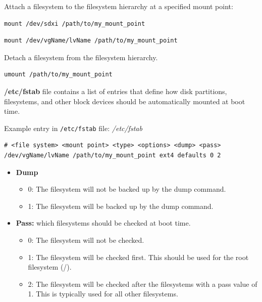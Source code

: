 \documentclass{article}
\newenvironment{codetemplate}[1][]{%
  \mybasecolorbox[#1]
  \itshape
}{%
  \endmybasecolorbox
}
\begin{document}
Attach a filesystem to the filesystem hierarchy at a specified mount point:
\begin{codetemplate}
\begin{verbatim}
mount /dev/sdxi /path/to/my_mount_point
\end{verbatim}
\end{codetemplate}

\begin{codetemplate}
\begin{verbatim}
mount /dev/vgName/lvName /path/to/my_mount_point
\end{verbatim}
\end{codetemplate}

Detach a filesystem from the filesystem hierarchy.

\begin{codetemplate}
\begin{verbatim}
umount /path/to/my_mount_point
\end{verbatim}
\end{codetemplate}

\textbf{/etc/fstab} file contains a list of entries that define how disk partitions, filesystems, and other block devices should be automatically mounted at boot time.

Example entry in \verb|/etc/fstab| file:
\begin{codetemplate}{/etc/fstab}
\begin{verbatim}
# <file system> <mount point> <type> <options> <dump> <pass>
/dev/vgName/lvName /path/to/my_mount_point ext4 defaults 0 2
\end{verbatim}
\end{codetemplate}

\begin{itemize}
    \item \textbf{Dump}
    \begin{itemize}
        \item 0: The filesystem will not be backed up by the dump command.
        \item 1: The filesystem will be backed up by the dump command.
    \end{itemize}
    \item \textbf{Pass:} which filesystems should be checked at boot time.
    \begin{itemize}
        \item 0: The filesystem will not be checked.
        \item 1: The filesystem will be checked first. This should be used for the root filesystem (/).
        \item 2: The filesystem will be checked after the filesystems with a pass value of 1. This is typically used for all other filesystems.
    \end{itemize}
\end{itemize}
\end{document}

